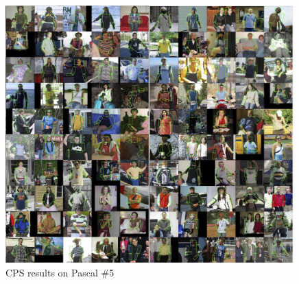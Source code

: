 \begin{figure}[tb]
\begin{center}
\includegraphics[width=0.99\textwidth]{figs/pascal-cps-5.jpg}
\caption[CPS results on Pascal \#5]{CPS results on Pascal \#5}
\label{fig:pascal-cps5}
\end{center}
\end{figure}


